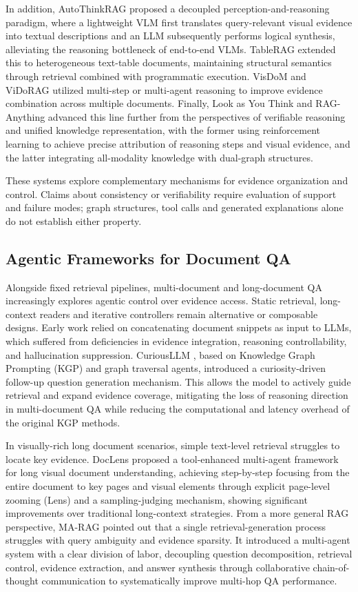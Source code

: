 In addition, AutoThinkRAG proposed a decoupled perception-and-reasoning paradigm, where a lightweight VLM first translates query-relevant visual evidence into textual descriptions and an LLM subsequently performs logical synthesis, alleviating the reasoning bottleneck of end-to-end VLMs. TableRAG \cite{yu2025tablerag} extended this to heterogeneous text-table documents, maintaining structural semantics through retrieval combined with programmatic execution. VisDoM \cite{suri2025visdom} and ViDoRAG \cite{wang2025vidorag} utilized multi-step or multi-agent reasoning to improve evidence combination across multiple documents. Finally, Look as You Think \cite{liu2025look} and RAG-Anything \cite{guo2025rag} advanced this line further from the perspectives of verifiable reasoning and unified knowledge representation, with the former using reinforcement learning to achieve precise attribution of reasoning steps and visual evidence, and the latter integrating all-modality knowledge with dual-graph structures.

These systems explore complementary mechanisms for evidence organization and control. Claims about consistency or verifiability require evaluation of support and failure modes; graph structures, tool calls and generated explanations alone do not establish either property.

\subsection{Agentic Frameworks for Document QA}
Alongside fixed retrieval pipelines, multi-document and long-document QA increasingly explores agentic control over evidence access. Static retrieval, long-context readers and iterative controllers remain alternative or composable designs. Early work relied on concatenating document snippets as input to LLMs, which suffered from deficiencies in evidence integration, reasoning controllability, and hallucination suppression. CuriousLLM \cite{yang2025curiousllm}, based on Knowledge Graph Prompting (KGP) and graph traversal agents, introduced a curiosity-driven follow-up question generation mechanism. This allows the model to actively guide retrieval and expand evidence coverage, mitigating the loss of reasoning direction in multi-document QA while reducing the computational and latency overhead of the original KGP methods.

In visually-rich long document scenarios, simple text-level retrieval struggles to locate key evidence. DocLens \cite{zhu2025doclens} proposed a tool-enhanced multi-agent framework for long visual document understanding, achieving step-by-step focusing from the entire document to key pages and visual elements through explicit page-level zooming (Lens) and a sampling-judging mechanism, showing significant improvements over traditional long-context strategies. From a more general RAG perspective, MA-RAG \cite{nguyen2025ma} pointed out that a single retrieval-generation process struggles with query ambiguity and evidence sparsity. It introduced a multi-agent system with a clear division of labor, decoupling question decomposition, retrieval control, evidence extraction, and answer synthesis through collaborative chain-of-thought communication to systematically improve multi-hop QA performance.

